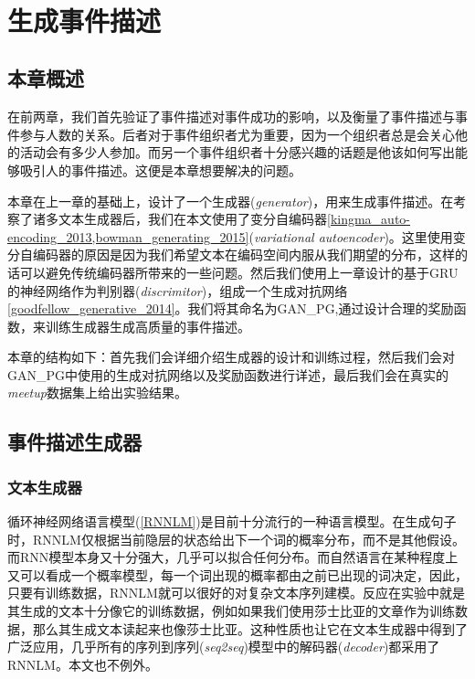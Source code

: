 \documentclass[]{template}
\begin{document}
~
\section{生成事件描述}
\subsection{本章概述}
在前两章，我们首先验证了事件描述对事件成功的影响，以及衡量了事件描述与事件参与人数的关系。后者对于事件组织者尤为重要，因为一个组织者总是会关心他的活动会有多少人参加。而另一个事件组织者十分感兴趣的话题是他该如何写出能够吸引人的事件描述。这便是本章想要解决的问题。

本章在上一章的基础上，设计了一个生成器(\textit{generator})，用来生成事件描述。在考察了诸多文本生成器后，我们在本文使用了变分自编码器\ref{kingma_auto-encoding_2013,bowman_generating_2015}(\textit{variational autoencoder})。这里使用变分自编码器的原因是因为我们希望文本在编码空间内服从我们期望的分布，这样的话可以避免传统编码器所带来的一些问题。然后我们使用上一章设计的基于GRU的神经网络作为判别器(\textit{discrimitor})，组成一个生成对抗网络\ref{goodfellow_generative_2014}。我们将其命名为GAN\_PG,通过设计合理的奖励函数，来训练生成器生成高质量的事件描述。

本章的结构如下：首先我们会详细介绍生成器的设计和训练过程，然后我们会对GAN\_PG中使用的生成对抗网络以及奖励函数进行详述，最后我们会在真实的\textit{meetup}数据集上给出实验结果。

\subsection{事件描述生成器}
\subsubsection{文本生成器}
循环神经网络语言模型(\ref{RNNLM})是目前十分流行的一种语言模型。在生成句子时，RNNLM仅根据当前隐层的状态给出下一个词的概率分布，而不是其他假设。而RNN模型本身又十分强大，几乎可以拟合任何分布。而自然语言在某种程度上又可以看成一个概率模型，每一个词出现的概率都由之前已出现的词决定，因此，只要有训练数据，RNNLM就可以很好的对复杂文本序列建模。反应在实验中就是其生成的文本十分像它的训练数据，例如如果我们使用莎士比亚的文章作为训练数据，那么其生成文本读起来也像莎士比亚。这种性质也让它在文本生成器中得到了广泛应用，几乎所有的序列到序列(\textit{seq2seq})模型中的解码器(\textit{decoder})都采用了RNNLM。本文也不例外。
\end{document}
